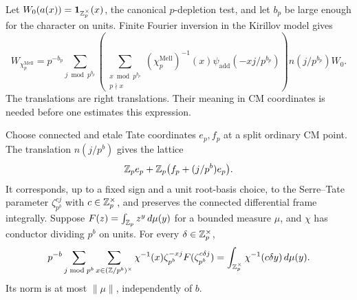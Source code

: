 Let $W_0(a(x))=\mathbf1_{\mathbb Z_p^\times}(x)$, the canonical
$p$-depletion test, and let $b_p$ be large enough for the character
on units.  Finite Fourier inversion in the Kirillov model gives
\begin{equation}
 W_{\chi_p^{\mathrm{Mell}}}
 =p^{-b_p}\sum_{j\bmod p^{b_p}}
   \left(\sum_{\substack{x\bmod p^{b_p}\\p\nmid x}}
    (\chi_p^{\mathrm{Mell}})^{-1}(x)
       \psi_{\mathrm{add}}(-xj/p^{b_p})\right)
       n(j/p^{b_p})W_0.
 \tag{19}\label{eq:source-19}
\end{equation}
The translations are right translations.  Their meaning in CM
coordinates is needed before one estimates this expression.

\begin{lemma}
\label{theta:fourier-measure}
Choose connected and etale Tate coordinates $e_p,f_p$ at a split
ordinary CM point.  The translation $n(j/p^b)$ gives the lattice
\[
 \mathbb Z_pe_p+\mathbb Z_p\bigl(f_p+(j/p^b)e_p\bigr).
\]
It corresponds, up to a fixed sign and a unit root-basis choice,
to the Serre--Tate parameter $\zeta_{p^b}^{cj}$ with
$c\in\mathbb Z_p^\times$, and preserves the connected differential frame
integrally.  Suppose $F(z)=\int_{\mathbb Z_p}z^y\,d\mu(y)$ for a bounded
measure $\mu$, and $\chi$ has conductor dividing $p^b$ on units.
For every $\delta\in\mathbb Z_p^\times$,
\begin{equation}\label{theta:fourier-cancellation}
 p^{-b}\sum_{j\bmod p^b}\sum_{x\in(\mathbb Z/p^b)^\times}
     \chi^{-1}(x)\zeta_{p^b}^{-xj}
       F(\zeta_{p^b}^{c\delta j})
   =\int_{\mathbb Z_p^\times}\chi^{-1}(c\delta y)\,d\mu(y).
\end{equation}
Its norm is at most $\|\mu\|$, independently of $b$.
\end{lemma}

